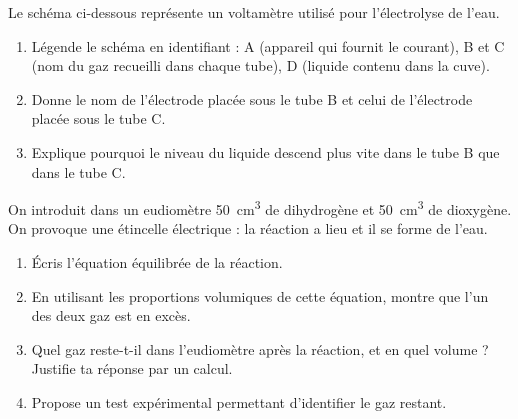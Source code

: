 \documentclass[11pt]{article}
\begin{document}
\begin{exercice}
Le schéma ci-dessous représente un voltamètre utilisé pour l'électrolyse de l'eau.
\begin{center}
\end{center}
\begin{enumerate}
\item Légende le schéma en identifiant : A (appareil qui fournit le courant), B et C (nom du gaz recueilli dans chaque tube), D (liquide contenu dans la cuve).
\item Donne le nom de l'électrode placée sous le tube B et celui de l'électrode placée sous le tube C.
\item Explique pourquoi le niveau du liquide descend plus vite dans le tube B que dans le tube C.
\end{enumerate}
\end{exercice}

\begin{exercice}
On introduit dans un eudiomètre \SI{50}{cm^3} de dihydrogène et \SI{50}{cm^3} de dioxygène. On provoque une étincelle électrique : la réaction a lieu et il se forme de l'eau.
\begin{enumerate}
\item Écris l'équation équilibrée de la réaction.
\item En utilisant les proportions volumiques de cette équation, montre que l'un des deux gaz est en excès.
\item Quel gaz reste-t-il dans l'eudiomètre après la réaction, et en quel volume ? Justifie ta réponse par un calcul.
\item Propose un test expérimental permettant d'identifier le gaz restant.
\end{enumerate}
\end{exercice}
\end{document}
